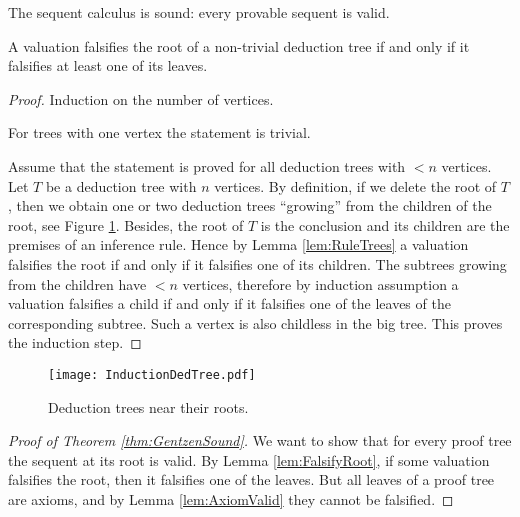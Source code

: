 \begin{page}

\begin{thm}
\label{thm:GentzenSound}
The sequent calculus is sound: every provable sequent is valid.
\end{thm}

\end{page}

\begin{page}

\begin{lem}
\label{lem:FalsifyRoot}
A valuation falsifies the root of a non-trivial deduction tree if and only if it falsifies at least one of its leaves.
\end{lem}

\end{page}

\begin{page}

\begin{proof}
Induction on the number of vertices.

For trees with one vertex the statement is trivial.

Assume that the statement is proved for all deduction trees with $< n$ vertices.
Let $T$ be a deduction tree with $n$ vertices.
By definition, if we delete the root of $T$, then we obtain one or two deduction trees ``growing'' from the children of the root,
see Figure \ref{fig:InductionDedTree}.
Besides, the root of $T$ is the conclusion and its children are the premises of an inference rule.
Hence by Lemma \ref{lem:RuleTrees} a valuation falsifies the root if and only if it falsifies one of its children.
The subtrees growing from the children have $< n$ vertices,
therefore by induction assumption a valuation falsifies a child if and only if it falsifies one of the leaves of the corresponding subtree.
Such a vertex is also childless in the big tree.
This proves the induction step.
\end{proof}

\begin{figure}[ht]
\begin{center}
\texttt{[image: InductionDedTree.pdf]}
\end{center}
\caption{Deduction trees near their roots.}
\label{fig:InductionDedTree}
\end{figure}

\begin{proof}[Proof of Theorem \ref{thm:GentzenSound}]
We want to show that for every proof tree the sequent at its root is valid.
By Lemma \ref{lem:FalsifyRoot}, if some valuation falsifies the root, then it falsifies one of the leaves.
But all leaves of a proof tree are axioms, and by Lemma \ref{lem:AxiomValid} they cannot be falsified.
\end{proof}



\end{page}

